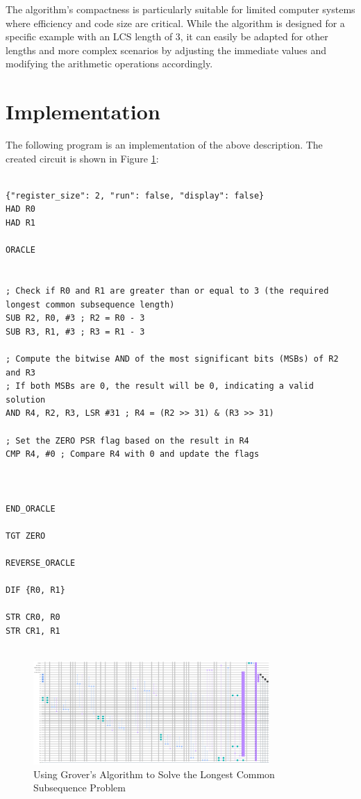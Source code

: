 The algorithm's compactness is particularly suitable for limited computer systems where efficiency and code size are critical. While the algorithm is designed for a specific example with an LCS length of 3, it can easily be adapted for other lengths and more complex scenarios by adjusting the immediate values and modifying the arithmetic operations accordingly.



\section{Implementation}

The following program is an implementation of the above description. The created circuit is shown in Figure \ref{fig:Longest_Common_Subsequence}:

\begin{lstlisting}

{"register_size": 2, "run": false, "display": false}
HAD R0
HAD R1

ORACLE


; Check if R0 and R1 are greater than or equal to 3 (the required longest common subsequence length)
SUB R2, R0, #3 ; R2 = R0 - 3
SUB R3, R1, #3 ; R3 = R1 - 3

; Compute the bitwise AND of the most significant bits (MSBs) of R2 and R3
; If both MSBs are 0, the result will be 0, indicating a valid solution
AND R4, R2, R3, LSR #31 ; R4 = (R2 >> 31) & (R3 >> 31)

; Set the ZERO PSR flag based on the result in R4
CMP R4, #0 ; Compare R4 with 0 and update the flags



END_ORACLE

TGT ZERO

REVERSE_ORACLE

DIF {R0, R1}

STR CR0, R0
STR CR1, R1


\end{lstlisting}

\begin{figure}[htp]
    \centering
    \includegraphics[width=9cm]{Figures/Longest_Common_Subsequence_circuit.png}
    \caption{Using Grover's Algorithm to Solve the Longest Common Subsequence Problem}
    \label{fig:Longest_Common_Subsequence}
\end{figure}

